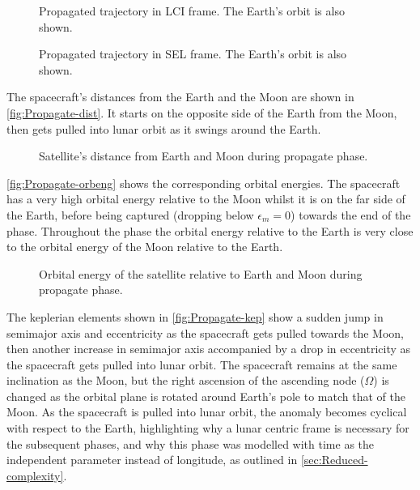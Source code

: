 \begin{figure}
\centering
\def\svgwidth{\figurewidth}

\caption{Propagated trajectory in LCI frame. The Earth's orbit is also shown.}
\label{fig:Propagate-3D-lci}
\end{figure}

\begin{figure}
\centering
\def\svgwidth{\figurewidth}

\caption{Propagated trajectory in SEL frame. The Earth's orbit is also shown.}
\label{fig:Propagate-3D-sel}
\end{figure}

The spacecraft's distances from the Earth and the Moon are shown in \autoref{fig:Propagate-dist}. It starts on the opposite side of the Earth from the Moon, then gets pulled into lunar orbit as it swings around the Earth. 

\begin{figure}
\centering
\def\svgwidth{\figurewidth}

\caption{Satellite's distance from Earth and Moon during propagate phase.}
\label{fig:Propagate-dist}
\end{figure}

\autoref{fig:Propagate-orbeng} shows the corresponding orbital energies. The spacecraft has a very high orbital energy relative to the Moon whilst it is on the far side of the Earth, before being captured (dropping below $\epsilon_m=0$) towards the end of the phase. Throughout the phase the orbital energy relative to the Earth is very close to the orbital energy of the Moon relative to the Earth.

\begin{figure}
\centering
\def\svgwidth{\figurewidth}

\caption{Orbital energy of the satellite relative to Earth and Moon during propagate phase.}
\label{fig:Propagate-orbeng}
\end{figure}

The keplerian elements shown in \autoref{fig:Propagate-kep} show a sudden jump in semimajor axis and eccentricity as the spacecraft gets pulled towards the Moon, then another increase in semimajor axis accompanied by a drop in eccentricity as the spacecraft gets pulled into lunar orbit. The spacecraft remains at the same inclination as the Moon, but the right ascension of the ascending node ($\Omega$) is changed as the orbital plane is rotated around Earth's pole to match that of the Moon. As the spacecraft is pulled into lunar orbit, the anomaly becomes cyclical with respect to the Earth, highlighting why a lunar centric frame is necessary for the subsequent phases, and why this phase was modelled with time as the independent parameter instead of longitude, as outlined in \autoref{sec:Reduced-complexity}.

